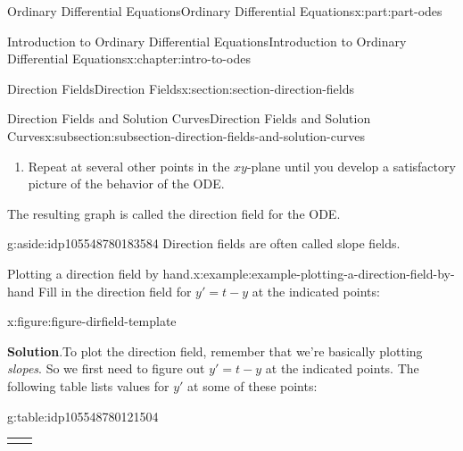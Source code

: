 \documentclass[oneside,10pt,]{book}
\newcommand{\blocktitlefont}{\relax}
\newcommand{\tabularfont}{\relax}
\numberwithin{equation}{part}
\newcommand{\hrulethick} {\noalign{\hrule height 0.11em}}
\begin{document}
\begin{partptx}{Ordinary Differential Equations}{}{Ordinary Differential Equations}{}{}{x:part:part-odes}
\begin{chapterptx}{Introduction to Ordinary Differential Equations}{}{Introduction to Ordinary Differential Equations}{}{}{x:chapter:intro-to-odes}
\begin{sectionptx}{Direction Fields}{}{Direction Fields}{}{}{x:section:section-direction-fields}
\begin{subsectionptx}{Direction Fields and Solution Curves}{}{Direction Fields and Solution Curves}{}{}{x:subsection:subsection-direction-fields-and-solution-curves}
\begin{enumerate}
\item{}Repeat at several other points in the \(xy\)-plane until you develop a satisfactory picture of the behavior of the ODE.%
\end{enumerate}
The resulting graph is called the direction field for the ODE.%
\begin{aside}{}{g:aside:idp105548780183584}%
Direction fields are often called slope fields.%
\end{aside}
\begin{example}{Plotting a direction field by hand.}{x:example:example-plotting-a-direction-field-by-hand}%
Fill in the direction field for \(y' = t - y\) at the indicated points:%
\begin{figureptx}{}{x:figure:figure-dirfield-template}{}%
\begin{image}{0.25}{0.5}{0.25}%
%
\end{image}%
\tcblower
\end{figureptx}%
\par\smallskip%
\noindent\textbf{\blocktitlefont Solution}.\hypertarget{g:solution:idp105548780119968}{}\quad{}To plot the direction field, remember that we're basically plotting \emph{slopes}. So we first need to figure out \(y' = t-y\) at the indicated points. The following table lists values for \(y'\) at some of these points: \begin{tableptx}{\textbf{}}{g:table:idp105548780121504}{}%
\centering%
{\tabularfont%
\begin{tabular}{cc}\hrulethick

\end{tabular}}
\end{tableptx}
\end{example}
\end{subsectionptx}
\end{sectionptx}
\end{chapterptx}
\end{partptx}
\end{document}
